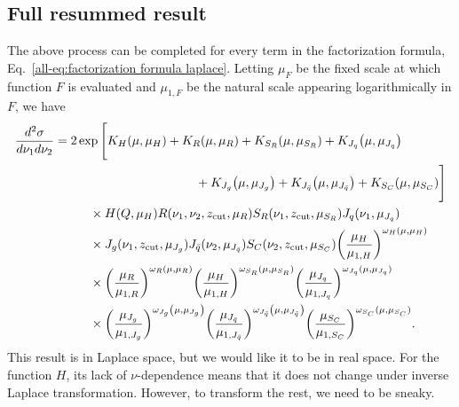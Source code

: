 \documentclass[../thesis.tex]{subfiles}
\providecommand{\zcut}{z_\mathrm{{cut}}}
\begin{document}
\subsection{Full resummed result}\label{all-sec:full resummed result}
	The above process can be completed for every term in the factorization formula, Eq.~\ref{all-eq:factorization formula laplace}. Letting $\mu_F$ be the fixed scale at which function $F$ is evaluated and $\mu_{1, F}$ be the natural scale appearing logarithmically in $F$, we have
	\begin{equation}\label{all-eq:full resummed result Laplace}
	\begin{aligned}
		\frac{d^2\sigma}{d\nu_1 d\nu_2} &= 2 \exp\Bigg[K_H(\mu, \mu_H)  + K_R(\mu, \mu_R) + K_{S_R}(\mu, \mu_{S_R}) + K_{J_q}\qty(\mu, \mu_{J_q})  \\
		&\hspace{4cm}+ K_{J_g}\qty(\mu, \mu_{J_g}) + K_{J_{\bar q}}\qty(\mu, \mu_{J_{\bar q}}) + K_{S_C}(\mu, \mu_{S_C}) \Bigg] \\
		&\hspace{1cm}\times H(Q, \mu_H) R(\nu_1, \nu_2, \zcut, \mu_R) S_R(\nu_1, \zcut, \mu_{S_R}) J_q(\nu_1, \mu_{J_q}) \\
		&\hspace{1cm}\times J_g(\nu_1, \zcut, \mu_{J_g}) J_{\bar q}(\nu_2, \mu_{J_{\bar q}}) S_C(\nu_2, \zcut, \mu_{S_C}) \qty(\frac{\mu_H}{\mu_{1, H}})^{\omega_H(\mu, \mu_H)} \\
		&\hspace{1cm}\times  \qty(\frac{\mu_R}{\mu_{1, R}})^{\omega_R(\mu, \mu_R)} \qty(\frac{\mu_H}{\mu_{1, H}})^{\omega_{S_R}(\mu, \mu_{S_R})} \qty(\frac{\mu_{J_q}}{\mu_{1, J_q}})^{\omega_{J_q}(\mu, \mu_{J_q})} \\
		&\hspace{1cm}\times  \qty(\frac{\mu_{J_g}}{\mu_{1, J_g}})^{\omega_{J_g}\qty(\mu, \mu_{J_g})} \qty(\frac{\mu_{J_{\bar q}}}{\mu_{1, J_{\bar q}}})^{\omega_{J_{\bar q}}\qty(\mu, \mu_{J_{\bar q}})} \qty(\frac{\mu_{S_C}}{\mu_{1, S_C}})^{\omega_{S_C}(\mu, \mu_{S_C})}.
	\end{aligned}
	\end{equation}
	This result is in Laplace space, but we would like it to be in real space. For the function $H$, its lack of $\nu$-dependence means that it does not change under inverse Laplace transformation. However, to transform the rest, we need to be sneaky.
\end{document}
